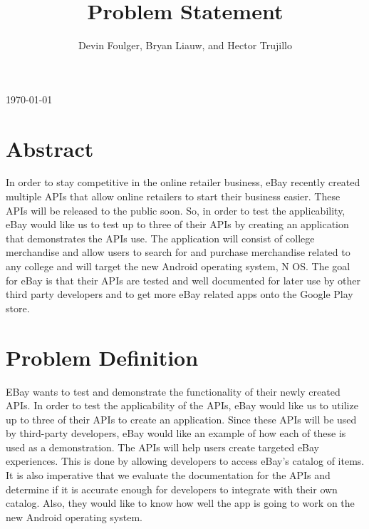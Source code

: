 \documentclass[letterpaper, 10pt, draftclsnofoot, onecolumn]{IEEEtran}
\def\name{Devin Foulger, Bryan Liauw, and Hector Trujillo }
\begin{document}
\title{ Problem Statement}
\author{\name\vspace{-10ex}}
\maketitle
\begin{center}
	\today\vspace{2ex}
\end{center}
\section*{Abstract}
	In order to stay competitive in the online retailer business, eBay recently 
	created multiple APIs that allow online retailers to start their business 
	easier. These APIs will be released to the public soon. So, in order to test 
	the applicability, eBay would like us to test up to three of their APIs by 
	creating an application that demonstrates the APIs use. The application will 
	consist of college merchandise and allow users to search for and purchase 
	merchandise related to any college and will target the new Android operating 
	system, N OS. The goal for eBay is that their APIs are tested and well documented 
	for later use by other third party developers and to get more eBay related apps 
	onto the Google Play store.

\section*{Problem Definition}
	EBay wants to test and demonstrate the functionality of their newly created APIs. 
	In order to test the applicability of the APIs, eBay would like us to utilize up to 
	three of their APIs to create an application. Since these APIs will be used by 
	third-party developers, eBay would like an example of how each of these is used
	 as a demonstration. The APIs will help users create targeted eBay experiences.
	 This is done by allowing developers to access eBay's catalog of items. It is 
	also imperative that we evaluate the documentation for the APIs and determine 
	if it is accurate enough for developers to integrate with their own catalog. 
	Also, they would like to know how well the app is going to work on the new 
	Android operating system. 
\end{document}
